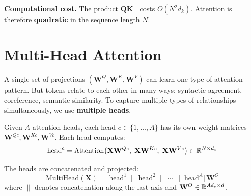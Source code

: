 \documentclass[main.tex]{subfiles}
\begin{document}
\begin{center}
\end{center}

\textbf{Computational cost.} The product $\mathbf{Q}\mathbf{K}^\top$ costs $O(N^2 d_k)$. Attention is therefore \textbf{quadratic} in the sequence length $N$.

\needspace{0.33\textheight}
\section{Multi-Head Attention}

A single set of projections $(\mathbf{W}^Q, \mathbf{W}^K, \mathbf{W}^V)$ can learn one type of attention pattern. But tokens relate to each other in many ways: syntactic agreement, coreference, semantic similarity. To capture multiple types of relationships simultaneously, we use \textbf{multiple heads}.

\begin{definition}
Given $A$ attention heads, each head $c \in \{1, \ldots, A\}$ has its own weight matrices $\mathbf{W}^{Qc}, \mathbf{W}^{Kc}, \mathbf{W}^{Vc}$. Each head computes:
$$\text{head}^c = \text{Attention}\!\left(\mathbf{X}\mathbf{W}^{Qc},\; \mathbf{X}\mathbf{W}^{Kc},\; \mathbf{X}\mathbf{W}^{Vc}\right) \in \mathbb{R}^{N \times d_v}$$

The heads are concatenated and projected:
$$\text{MultiHead}(\mathbf{X}) = \bigl[\text{head}^1 \;\|\; \text{head}^2 \;\|\; \cdots \;\|\; \text{head}^A\bigr] \, \mathbf{W}^O$$
where $\|$ denotes concatenation along the last axis and $\mathbf{W}^O \in \mathbb{R}^{Ad_v \times d}$.
\end{definition}
\end{document}
